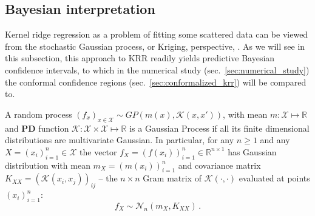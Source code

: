 \documentclass[a4paper,14pt]{extarticle}
\newcommand{\Ncal}{\mathcal{N}}
\newcommand{\Kcal}{\mathcal{K}}
\newcommand{\Xcal}{\mathcal{X}}
\newcommand{\Real}{\mathbb{R}}
\begin{document}
\subsection{Bayesian interpretation} %
\label{sub:bayesian_interpretation_of_krr}

Kernel ridge regression as a problem of fitting some scattered data can be viewed
from the stochastic Gaussian process, or Kriging, perspective, \cite{rasmussen2006}.
As we will see in this subsection, this approach to KRR readily yields predictive
Bayesian confidence intervals, to which in the numerical study (sec.~\ref{sec:numerical_study})
the conformal confidence regions (sec.~\ref{sec:conformalized_krr}) will be compared
to.

A random process $(f_x)_{x\in \Xcal} \sim GP(m(x), \Kcal(x,x'))$, with mean $m : \Xcal
\mapsto \Real$ and \textbf{PD} function $\Kcal : \Xcal \times \Xcal \mapsto \Real$
is a Gaussian Process if all its finite dimensional distributions are multivariate
Gaussian. In particular, for any $n\geq1$ and any $X = (x_i)_{i=1}^n \in \Xcal$ the
vector $f_X = (f(x_i))_{i=1}^n \in \Real^{n\times 1}$ has Gaussian distribution with
mean $m_X = (m(x_i))_{i=1}^n$ and covariance matrix $K_{XX} = (\Kcal(x_i,x_j))_{ij}$ --
the $n\times n$ Gram matrix of $\Kcal(\cdot,\cdot)$ evaluated at points $(x_i)_{i=1}^n$:
\begin{equation*}
  f_X \sim \Ncal_n(m_X, K_{XX}) \,.
\end{equation*}
\end{document}
